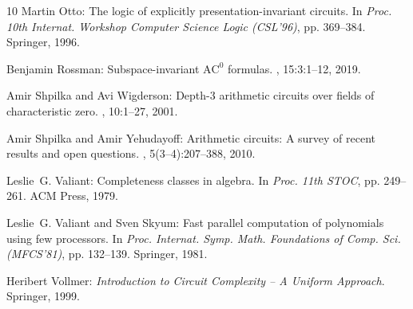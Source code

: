 \documentclass[11pt]{article}
\begin{document}
\begin{thebibliography}{10}
{\sc Martin Otto}: The logic of explicitly presentation-invariant circuits.
\newblock In {\em Proc. 10th Internat. Workshop Computer Science Logic
  (CSL'96)}, pp. 369--384. Springer, 1996.
\newblock [\epfmtdoi{10.1007/3-540-63172-0\_50}]

{\sc Benjamin Rossman}: Subspace-invariant {${\mathrm{AC}}^0$} formulas.
, 15:3:1--12, 2019.

{\sc Amir Shpilka and Avi Wigderson}: Depth-3 arithmetic circuits over fields
  of characteristic zero.
, 10:1--27, 2001.
\newblock [\epfmtdoi{10.1007/PL00001609}]

{\sc Amir Shpilka and Amir Yehudayoff}: Arithmetic circuits: {A} survey of
  recent results and open questions.
, 5(3--4):207--388, 2010.
\newblock [\epfmtdoi{10.1561/0400000039}]

{\sc Leslie~G. Valiant}: Completeness classes in algebra.
\newblock In {\em Proc. 11th STOC}, pp. 249--261. ACM Press, 1979.
\newblock [\epfmtdoi{10.1145/800135.804419}]

{\sc Leslie~G. Valiant and Sven Skyum}: Fast parallel computation of
  polynomials using few processors.
\newblock In {\em Proc. Internat. Symp. Math. Foundations of Comp. Sci.
  (MFCS'81)}, pp. 132--139. Springer, 1981.
\newblock [\epfmtdoi{10.1007/3-540-10856-4\_79}]

{\sc Heribert Vollmer}: {\em Introduction to Circuit Complexity -- {A} Uniform
  Approach}.
\newblock Springer, 1999.
\newblock [\epfmtdoi{10.1007/978-3-662-03927-4}]

\end{thebibliography}
\end{document}
